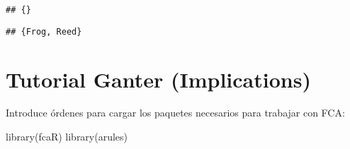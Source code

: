 \documentclass[
]{book}
\newenvironment{Shaded}{\begin{snugshade}}{\end{snugshade}}
\newcommand{\AttributeTok}[1]{\textcolor[rgb]{0.77,0.63,0.00}{#1}}
\newcommand{\DecValTok}[1]{\textcolor[rgb]{0.00,0.00,0.81}{#1}}
\newcommand{\FunctionTok}[1]{\textcolor[rgb]{0.00,0.00,0.00}{#1}}
\newcommand{\NormalTok}[1]{#1}
\newcommand{\OtherTok}[1]{\textcolor[rgb]{0.56,0.35,0.01}{#1}}
\newcommand{\SpecialCharTok}[1]{\textcolor[rgb]{0.00,0.00,0.00}{#1}}
\newcommand{\StringTok}[1]{\textcolor[rgb]{0.31,0.60,0.02}{#1}}
\begin{document}
\begin{Shaded}
\end{Shaded}

\begin{verbatim}
## {}
\end{verbatim}

\begin{Shaded}
\end{Shaded}

\begin{verbatim}
## {Frog, Reed}
\end{verbatim}

\hypertarget{tutorial-ganter-implications}{%
\section{Tutorial Ganter (Implications)}\label{tutorial-ganter-implications}}

Introduce órdenes para cargar los paquetes necesarios para trabajar con FCA:

\begin{Shaded}
\begin{Highlighting}[]
\FunctionTok{library}\NormalTok{(}\StringTok{\textquotesingle{}fcaR\textquotesingle{}}\NormalTok{)}
\FunctionTok{library}\NormalTok{(arules)}
\end{Highlighting}
\end{Shaded}
\end{document}
